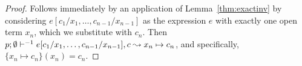 \begin{proof}

  Follows immediately by an application of Lemma~\ref{thm:exactinv} by
  considering $e[c_1 / x_1, \dots, c_{n-1} / x_{n-1}]$ as the expression $e$
  with exactly one open term $x_n$, which we substitute with $c_n$. Then
  $p;\emptyset\vdash^{-1} e[c_1 / x_1, \dots, c_{n-1} / x_{n-1}], c \leadsto x_n \mapsto
  c_n$, and specifically, $\{x_n \mapsto c_n\} (x_n) = c_n$.

\end{proof}
